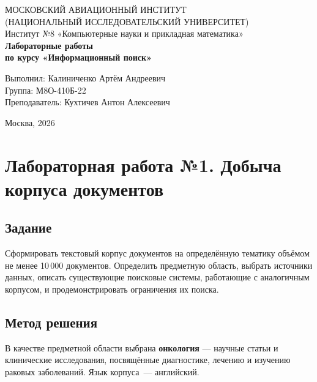 \documentclass[a4paper,12pt]{article}
\begin{document}
\begin{titlepage}
    \centering
    {\fontsize{14pt}{16pt}\selectfont МОСКОВСКИЙ АВИАЦИОННЫЙ ИНСТИТУТ\\(НАЦИОНАЛЬНЫЙ ИССЛЕДОВАТЕЛЬСКИЙ УНИВЕРСИТЕТ)}\\[0.5cm]
    {\fontsize{12pt}{14pt}\selectfont Институт №8 «Компьютерные науки и прикладная математика»}\\[4cm]
    
    {\fontsize{16pt}{18pt}\selectfont \textbf{Лабораторные работы}}\\
    {\fontsize{14pt}{16pt}\selectfont \textbf{по курсу «Информационный поиск»}}\\[5cm]
    
    \vfill
    \begin{flushright}
        \begin{minipage}{0.51\textwidth}
            Выполнил: Калиниченко Артём Андреевич \\
            Группа: М8О-410Б-22\\
            Преподаватель: Кухтичев Антон Алексеевич
        \end{minipage}
    \end{flushright}
    
    \vfill
    {\large Москва, 2026}
\end{titlepage}

\tableofcontents
\newpage

\section{Лабораторная работа №1. Добыча корпуса документов}

\subsection{Задание}

Сформировать текстовый корпус документов на определённую тематику объёмом не менее 10\,000 документов. Определить предметную область, выбрать источники данных, описать существующие поисковые системы, работающие с аналогичным корпусом, и продемонстрировать ограничения их поиска.

\subsection{Метод решения}

В качестве предметной области выбрана \textbf{онкология} --- научные статьи и клинические исследования, посвящённые диагностике, лечению и изучению раковых заболеваний. Язык корпуса~--- английский.
\end{document}
